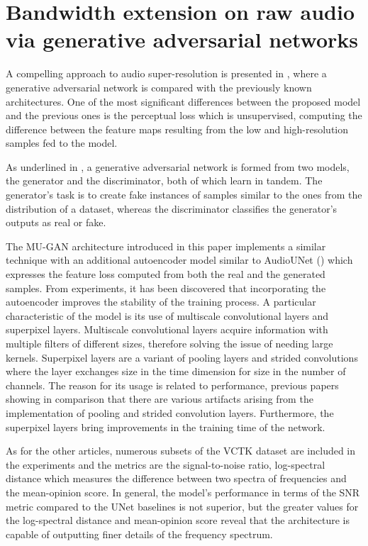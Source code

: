 \documentclass[conference]{IEEEtran}
\begin{document}
\section{Bandwidth extension on raw audio via generative adversarial networks}

A compelling approach to audio super-resolution is presented in \textcite{bandwidthextension2019}, where a generative adversarial network is compared with the previously known architectures. One of the most significant differences between the proposed model and the previous ones is the perceptual loss which is unsupervised, computing the difference between the feature maps resulting from the low and high-resolution samples fed to the model.

As underlined in \textcite{goodfellow2014}, a generative adversarial network is formed from two models, the generator and the discriminator, both of which learn in tandem. The generator's task is to create fake instances of samples similar to the ones from the distribution of a dataset, whereas the discriminator classifies the generator's outputs as real or fake. 

The MU-GAN architecture introduced in this paper implements a similar technique with an additional autoencoder model similar to AudioUNet (\textcite{kuleshov2017audio}) which expresses the feature loss computed from both the real and the generated samples. From experiments, it has been discovered that incorporating the autoencoder improves the stability of the training process. A particular characteristic of the model is its use of multiscale convolutional layers and superpixel layers. Multiscale convolutional layers acquire information with multiple filters of different sizes, therefore solving the issue of needing large kernels. Superpixel layers are a variant of pooling layers and strided convolutions where the layer exchanges size in the time dimension for size in the number of channels. The reason for its usage is related to performance, previous papers showing in comparison that there are various artifacts arising from the implementation of pooling and strided convolution layers. Furthermore, the superpixel layers bring improvements in the training time of the network.

As for the other articles, numerous subsets of the VCTK dataset are included in the experiments and the metrics are the signal-to-noise ratio, log-spectral distance which measures the difference between two spectra of frequencies and the mean-opinion score. In general, the model's performance in terms of the SNR metric compared to the UNet baselines is not superior, but the greater values for the log-spectral distance and mean-opinion score reveal that the architecture is capable of outputting finer details of the frequency spectrum. 

	
\printbibliography
\vspace{12pt}
\end{document}

